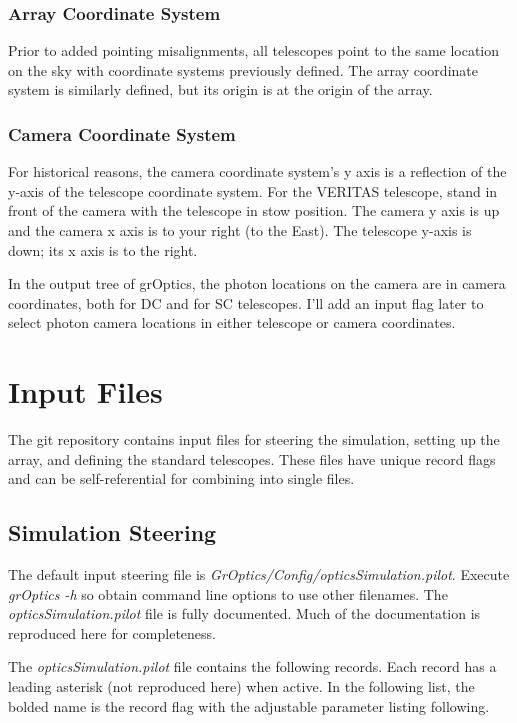 \documentclass{article}
\begin{document}
\subsubsection{Array Coordinate System} 
  Prior to added pointing misalignments, all telescopes point to the same location
  on the sky with coordinate systems previously defined.  
  The array coordinate system is similarly defined, but its
  origin is at the origin of the array.

\subsubsection{Camera Coordinate System}
  For historical reasons, the camera coordinate system's y axis is a reflection of the 
  y-axis of the telescope coordinate system. For the VERITAS telescope, stand in front of the
  camera with the telescope in stow position. The camera y axis is up and the camera x axis
  is to your right (to the East).  The telescope y-axis is down; its x axis is to the right.
  
  In the output tree of grOptics, the photon locations on the camera are in camera coordinates,
  both for DC and for SC telescopes.  I'll add an input flag later to select photon camera
  locations in either telescope or camera coordinates.

\section{Input Files}\label{S:INPUT}
The git repository contains input files for steering the simulation, 
setting up the array, and defining the standard telescopes. These files have
unique record flags and can be self-referential for combining into single files.

\subsection{Simulation Steering}\label{SS:STEER}
The default input steering file is \emph{GrOptics/Config/opticsSimulation.pilot}. 
Execute \emph{grOptics -h} so obtain command line options to use other filenames.
The \emph{opticsSimulation.pilot} file is fully documented. Much of the documentation
is reproduced here for completeness.

The \emph{opticsSimulation.pilot} file contains the following records. Each record has a 
leading asterisk (not reproduced here) when active. In the following list, the bolded name
is the record flag with the adjustable parameter listing following.
\end{document}
